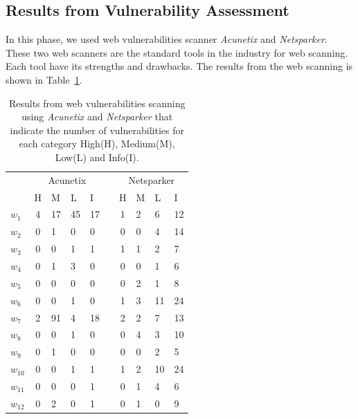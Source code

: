 \documentclass[conference,letterpaper]{IEEEtran}
\begin{document}
\subsection{Results from Vulnerability Assessment}

In this phase, we used web vulnerabilities scanner \emph{Acunetix} and
\emph{Netsparker}. These two web scanners are the standard tools in
the industry for web scanning. Each tool have its strengths and
drawbacks. The results from the web scanning is shown in
Table~\ref{tab:vuln}.





\begin{table}[thbp]
  \caption{Results from web vulnerabilities scanning using
    \emph{Acunetix} and \emph{Netsparker} that indicate the number of
    vulnerabilities for each category High(H), Medium(M), Low(L) and
    Info(I).}
	\label{tab:vuln}
	\centering
	\begin{tabular}{lcllllclll}
          & \multicolumn{4}{c}{Acunetix} &  & \multicolumn{4}{c}{Netsparker} \\ \cline{2-5} \cline{7-10} 
          & H & M & L & I &  & H & M & L & I \\ \cline{2-5} \cline{7-10} 
          $w_1$ & 4 & 17 & 45 & 17 &  & 1 & 2 & 6 & 12 \\
          $w_2$ & 0 & 1 & 0 & 0 &  & 0 & 0 & 4 & 14 \\
          $w_3$ & 0 & 0 & 1 & 1 &  & 1 & 1 & 2 & 7 \\
          $w_4$ & 0 & 1 & 3 & 0 &  & 0 & 0 & 1 & 6 \\
          $w_5$ & 0 & 0 & 0 & 0 &  & 0 & 2 & 1 & 8 \\
          $w_6$ & 0 & 0 & 1 & 0 &  & 1 & 3 & 11 & 24 \\
          $w_7$ & 2 & 91 & 4 & 18 &  & 2 & 2 & 7 & 13 \\
          $w_8$ & 0 & 0 & 1 & 0 &  & 0 & 4 & 3 & 10 \\
          $w_9$ & 0 & 1 & 0 & 0 &  & 0 & 0 & 2 & 5 \\
          $w_{10}$ & 0 & 0 & 1 & 1 &  & 1 & 2 & 10 & 24 \\
          $w_{11}$ & 0 & 0 & 0 & 1 &  & 0 & 1 & 4 & 6 \\
          $w_{12}$ & 0 & 2 & 0 & 1 &  & 0 & 1 & 0 & 9 \\

\end{tabular}
\end{table}
\end{document}
